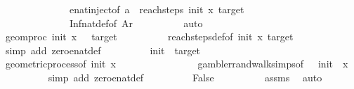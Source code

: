\begin{isabellebody}
\ \ \ \ \ \ \ \ \ \ \ \ \ \ enat{\isachardot}{\kern0pt}inject{\isacharbrackleft}{\kern0pt}of\ a\ {\isachardoublequoteopen}{\isasymSqinter}\ reach{\isacharunderscore}{\kern0pt}steps\ init\ x\ target{\isachardoublequoteclose}{\isacharbrackright}{\kern0pt}\isanewline
\ \ \ \ \ \ \ \ \ \ \ \ \ \ Inf{\isacharunderscore}{\kern0pt}nat{\isacharunderscore}{\kern0pt}def{}{\isacharbrackleft}{\kern0pt}of\ Ar{\isacharbrackright}{\kern0pt}\isanewline
\ \ \ \ \ \ \ \ \isamarkupfalse%
\ auto\isanewline
\ \ \ \ \ \ \isamarkupfalse%
\ \isamarkupfalse%
\ {\isachardoublequoteopen}geom{\isacharunderscore}{\kern0pt}proc\ init\ x\ {}\ {\isasymin}\ {\isacharbraceleft}{\kern0pt}{}{\isacharcomma}{\kern0pt}target{\isacharbraceright}{\kern0pt}{\isachardoublequoteclose}\isanewline
\ \ \ \ \ \ \ \ \isamarkupfalse%
\ reach{\isacharunderscore}{\kern0pt}steps{\isacharunderscore}{\kern0pt}def{\isacharbrackleft}{\kern0pt}of\ init\ x\ target{\isacharbrackright}{\kern0pt}\isanewline
\ \ \ \ \ \ \ \ \isamarkupfalse%
\ {\isacharparenleft}{\kern0pt}simp\ add{\isacharcolon}{\kern0pt}\ zero{\isacharunderscore}{\kern0pt}enat{\isacharunderscore}{\kern0pt}def{\isacharparenright}{\kern0pt}\isanewline
\ \ \ \ \ \ \isamarkupfalse%
\ \isamarkupfalse%
\ {\isachardoublequoteopen}init\ {\isasymin}\ {\isacharbraceleft}{\kern0pt}{}{\isacharcomma}{\kern0pt}target{\isacharbraceright}{\kern0pt}{\isachardoublequoteclose}\isanewline
\ \ \ \ \ \ \ \ \isamarkupfalse%
\ geometric{\isacharunderscore}{\kern0pt}process{\isacharbrackleft}{\kern0pt}of\ init\ x\ {}{\isacharbrackright}{\kern0pt}\ \isanewline
\ \ \ \ \ \ \ \ \ \ \ \ \ \ gambler{\isacharunderscore}{\kern0pt}rand{\isacharunderscore}{\kern0pt}walk{\isachardot}{\kern0pt}simps{\isacharbrackleft}{\kern0pt}of\ {}\ {\isachardoublequoteopen}{\isacharminus}{\kern0pt}{}{\isachardoublequoteclose}\ init\ {}\ x{\isacharbrackright}{\kern0pt}\isanewline
\ \ \ \ \ \ \ \ \isamarkupfalse%
\ {\isacharparenleft}{\kern0pt}simp\ add{\isacharcolon}{\kern0pt}\ zero{\isacharunderscore}{\kern0pt}enat{\isacharunderscore}{\kern0pt}def{\isacharparenright}{\kern0pt}\isanewline
\ \ \ \ \ \ \isamarkupfalse%
\ \isamarkupfalse%
\ False\isanewline
\ \ \ \ \ \ \ \ \isamarkupfalse%
\ assms\ \isamarkupfalse%
\ auto\isanewline
\ \ \ \ \ \ \isamarkupfalse%
\ \isamarkupfalse%

\end{isabellebody}
